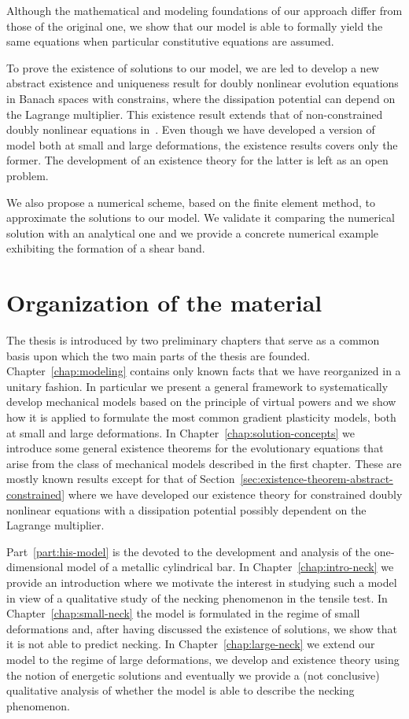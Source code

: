 \documentclass[a4paper,10pt,twoside]{amsbook}
\numberwithin{section}{chapter}
\numberwithin{equation}{chapter}
\theoremstyle{definition}
\begin{document}
Although the mathematical and modeling foundations of our approach differ from those of the original one, we show that our model is able to formally yield the same equations when particular constitutive equations are assumed.

To prove the existence of solutions to our model, we are led to develop a new abstract existence and uniqueness result for doubly nonlinear evolution equations in Banach spaces with constrains, where the dissipation potential can depend on the Lagrange multiplier. This existence result extends that of non-constrained doubly nonlinear equations in~\cite{roubicek-pde}. Even though we have developed a version of model both at small and large deformations, the existence results covers only the former. The development of an existence theory for the latter is left as an open problem.

We also propose a numerical scheme, based on the finite element method, to approximate the solutions to our model. We validate it comparing the numerical solution with an analytical one and we provide a concrete numerical example exhibiting the formation of a shear band.

\section*{Organization of the material}

The thesis is introduced by two preliminary chapters that serve as a common basis upon which the two main parts of the thesis are founded. Chapter~\ref{chap:modeling} contains only known facts that we have reorganized in a unitary fashion. In particular we present a general framework to systematically develop mechanical models based on the principle of virtual powers and we show how it is applied to formulate the most common gradient plasticity models, both at small and large deformations. In Chapter~\ref{chap:solution-concepts} we introduce some general existence theorems for the evolutionary equations that arise from the class of mechanical models described in the first chapter. These are mostly known results except for that of Section~\ref{sec:existence-theorem-abstract-constrained} where we have developed our existence theory for constrained doubly nonlinear equations with a dissipation potential possibly dependent on the Lagrange multiplier.

Part~\ref{part:his-model} is the devoted to the development and analysis of the one-dimensional model of a metallic cylindrical bar. In Chapter~\ref{chap:intro-neck} we provide an introduction where we motivate the interest in studying such a model in view of a qualitative study of the necking phenomenon in the tensile test. In Chapter~\ref{chap:small-neck} the model is formulated in the regime of small deformations and, after having discussed the existence of solutions, we show that it is not able to predict necking. In Chapter~\ref{chap:large-neck} we extend our model to the regime of large deformations, we develop and existence theory using the notion of energetic solutions and eventually we provide a (not conclusive) qualitative analysis of whether the model is able to describe the necking phenomenon.
\end{document}
